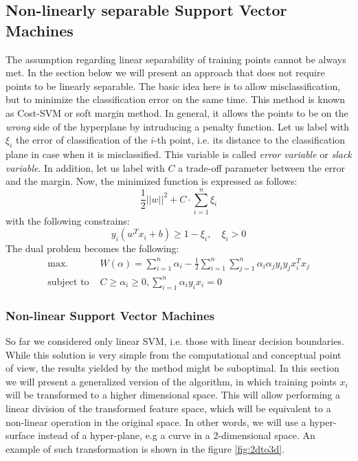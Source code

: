 \subsection{Non-linearly separable Support Vector Machines}
The assumption regarding linear separability of training points cannot be always met. In the section below we will present an approach that does not require points to be linearly separable. The basic idea here is to allow misclassification, but to minimize the classification error on the same time. This method is known as Cost-SVM or soft margin method. In general, it allows the points to be on the \textit{wrong} side of the hyperplane by intruducing a penalty function.
Let us label with $\xi_i$ the error of classification of the $i$-th point, i.e. its distance to the classification plane in case when it is misclassified. This variable is called \textit{error variable} or \textit{slack variable}. In addition, let us label with $C$ a trade-off parameter between the error and the margin. Now, the minimized function is expressed as follows:
\begin{equation}
\frac{1}{2}||w||^2 + C \cdot \sum_{i=1}^{n}\xi_i
\end{equation}
with the following constrains:
\begin{equation}
y_i \left(w^Tx_i+b\right) \ge 1-\xi_i, \quad \xi_i>0
\end{equation}
The dual problem becomes the following:
\begin{align*}
\textrm{max. }& W(\alpha) = \sum_{i=1}^{n}\alpha_i-\frac{1}{2}\sum_{i=1}^{n}\sum_{j=1}^{n}\alpha_i\alpha_jy_iy_jx^T_ix_j \\
\textrm{subject to }& C \ge \alpha_i \ge 0, \sum_{i=1}^{n}\alpha_iy_ix_i=0
\end{align*}

\subsubsection{Non-linear Support Vector Machines}
So far we considered only linear SVM, i.e. those with linear decision boundaries. While this solution is very simple from the computational and conceptual point of view, the results yielded by the method might be suboptimal. In this section we will present a generalized version of the algorithm, in which training points $x_i$ will be transformed to a higher dimensional space. This will allow performing a linear division of the transformed feature space, which will be equivalent to a non-linear operation in the original space. In other words, we will use a hyper-surface instead of a hyper-plane, e.g a curve in a 2-dimensional space. An example of such transformation is shown in the figure \ref{fig:2dto3d}.

